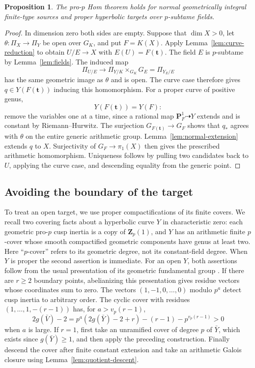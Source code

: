 \documentclass[11pt,a4paper]{article}
\numberwithin{equation}{section}
\theoremstyle{plain}
\newtheorem{proposition}[theorem]{Proposition}
\theoremstyle{definition}
\theoremstyle{remark}
\newcommand{\Zp}{\mathbf Z_p}
\newcommand{\PP}{\mathbf P}
\begin{document}
\begin{proposition}
\label{prop:proper-normal}
The pro-$p$ Hom theorem holds for normal geometrically integral
finite-type sources and proper hyperbolic targets over $p$-subtame
fields.
\end{proposition}
\begin{proof}
In dimension zero both sides are empty. Suppose that $\dim X>0$,
let $\theta:\Pi_X\to\Pi_Y$ be open over $G_K$, and put $F=K(X)$.
Apply Lemma~\ref{lem:curve-reduction} to obtain $U/E\to X$ with
$E(U)=F(\mathbf t)$. The field $E$ is $p$-subtame by
Lemma~\ref{lem:fields}. The induced map
\[
 \Pi_{U/E}\longrightarrow\Pi_{Y/K}\times_{G_K}G_E=\Pi_{Y_E/E}
\]
has the same geometric image as $\theta$ and is open. The curve case
therefore gives $q\in Y(F(\mathbf t))$ inducing this homomorphism.
For a proper curve of positive genus,
\[
                         Y(F(\mathbf t))=Y(F):
\]
remove the variables one at a time, since a rational map
$\PP^1_F\dashrightarrow Y$ extends and is constant by
Riemann--Hurwitz. The surjection $G_{F(\mathbf t)}\to G_F$ shows that
$q_*$ agrees with $\theta$ on the entire generic arithmetic group.
Lemma~\ref{lem:normal-extension} extends $q$ to $X$. Surjectivity of
$G_F\to\pi_1(X)$ \cite[Expos\'e~V, Proposition~8.2]{SGA1}
then gives the prescribed arithmetic homomorphism.
Uniqueness follows by pulling two candidates back to $U$, applying the
curve case, and descending equality from the generic point.
\end{proof}

\subsection{Avoiding the boundary of the target}

To treat an open target, we use proper compactifications of its finite
covers. We recall two covering facts about a hyperbolic curve $Y$ in
characteristic zero: each geometric pro-$p$ cusp inertia is a copy of
$\Zp(1)$, and $Y$ has an arithmetic finite $p$-cover whose smooth
compactified geometric components have genus at least two. Here
``$p$-cover'' refers to its geometric degree, not its constant-field
degree. When $Y$ is proper the second assertion is immediate. For an
open $Y$, both assertions follow from the usual presentation of its
geometric fundamental group
\cite[Expos\'e~XIII, Corollaire~2.12]{SGA1}. If there are $r\ge2$
boundary points, abelianizing this presentation gives residue vectors
whose coordinates sum to zero. The vectors
$(1,-1,0,\ldots,0)$ modulo $p^a$ detect cusp inertia to arbitrary
order. The cyclic cover with residues
$(1,\ldots,1,-(r-1))$ has, for $a>v_p(r-1)$,
\[
 2g(\bar V)-2
 =p^a(2g(\bar Y)-2+r)-(r-1)-p^{v_p(r-1)}>0
\]
when $a$ is large. If $r=1$, first take an unramified cover of degree
$p$ of $\bar Y$, which exists since $g(\bar Y)\ge1$, and then apply
the preceding construction. Finally descend the cover after finite
constant extension and take an arithmetic Galois closure using
Lemma~\ref{lem:quotient-descent}.
\end{document}
